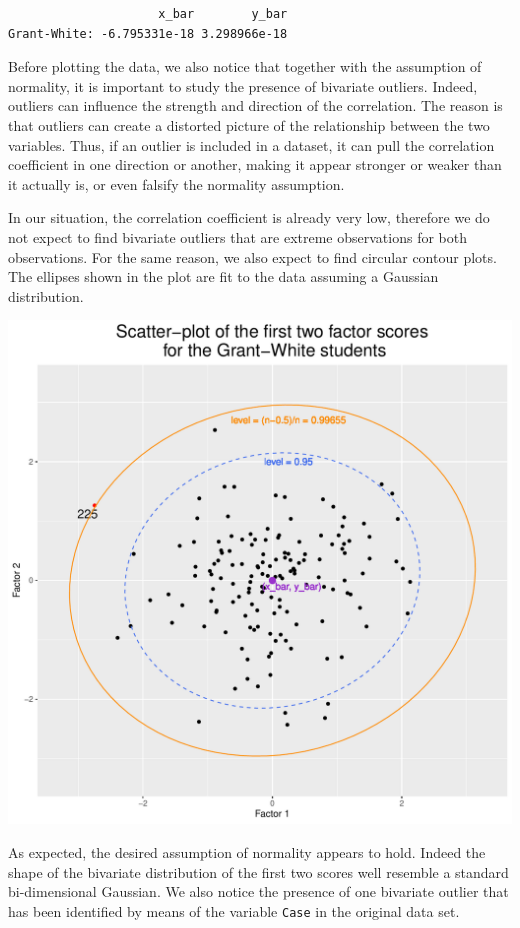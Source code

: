 \documentclass[
  letterpaper,
  DIV=11,
  numbers=noendperiod]{scrartcl}
\begin{document}
\begin{verbatim}
                     x_bar        y_bar
Grant-White: -6.795331e-18 3.298966e-18
\end{verbatim}

Before plotting the data, we also notice that together with the
assumption of normality, it is important to study the presence of
bivariate outliers. Indeed, outliers can influence the strength and
direction of the correlation. The reason is that outliers can create a
distorted picture of the relationship between the two variables. Thus,
if an outlier is included in a dataset, it can pull the correlation
coefficient in one direction or another, making it appear stronger or
weaker than it actually is, or even falsify the normality assumption.

In our situation, the correlation coefficient is already very low,
therefore we do not expect to find bivariate outliers that are extreme
observations for both observations. For the same reason, we also expect
to find circular contour plots. The ellipses shown in the plot are fit
to the data assuming a Gaussian distribution.

\includegraphics{ProblemSet2_files/figure-pdf/unnamed-chunk-38-1.pdf}

As expected, the desired assumption of normality appears to hold. Indeed
the shape of the bivariate distribution of the first two scores well
resemble a standard bi-dimensional Gaussian. We also notice the presence
of one bivariate outlier that has been identified by means of the
variable \texttt{Case} in the original data set.
\end{document}
